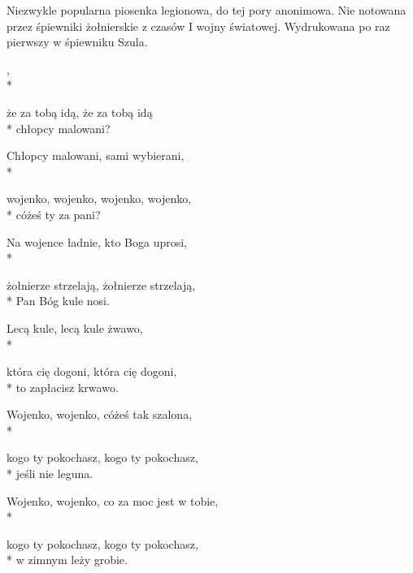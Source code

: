 \begin{info}Niezwykle popularna piosenka legionowa, do tej pory anonimowa. Nie notowana przez śpiewniki żołnierskie z czasów I wojny światowej. Wydrukowana po raz pierwszy w śpiewniku Szula.\end{info}

\begin{lyrics}[longestline={żołnierze strzelają, żołnierze strzelają,}]

,\\*
\begin{markverses}%
że za tobą idą, że za tobą idą\\*
chłopcy malowani?
\end{markverses}

Chłopcy malowani, sami wybierani,\\*
\begin{markverses}%
wojenko, wojenko, wojenko, wojenko,\\*
cóżeś ty za pani?
\end{markverses}

Na wojence ładnie, kto Boga uprosi,\\*
\begin{markverses}%
żołnierze strzelają, żołnierze strzelają,\\*
Pan Bóg kule nosi.
\end{markverses}

Lecą kule, lecą kule żwawo,\\*
\begin{markverses}%
która cię dogoni, która cię dogoni,\\*
to zapłacisz krwawo.
\end{markverses}

Wojenko, wojenko, cóżeś tak szalona,\\*
\begin{markverses}%
kogo ty pokochasz, kogo ty pokochasz,\\*
jeśli nie leguna.
\end{markverses}

Wojenko, wojenko, co za moc jest w tobie,\\*
\begin{markverses}%
kogo ty pokochasz, kogo ty pokochasz,\\*
w zimnym leży grobie.
\end{markverses}
\end{lyrics}



